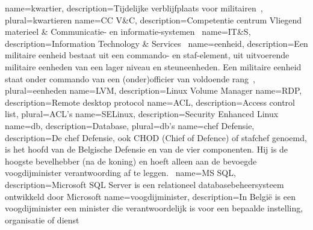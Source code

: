 \makeglossaries
{}
{
    name=kwartier,
    description={Tijdelijke verblijfplaats voor militairen~\autocite{Wikipedia2021}},
    plural=kwartieren
}
{
    name={CC V\&C},
    description={Competentie centrum Vliegend materieel \& Communicatie- en informatie-systemen~\autocite{Defensie2022a}}
}
{
    name=IT\&S,
    description={Information Technology \& Services~\autocite{Defensie2022a}}
}
{
    name=eenheid,
    description={Een militaire eenheid bestaat uit een commando- en staf-element, uit uitvoerende militaire eenheden van een lager niveau en steuneenheden. Een militaire eenheid staat onder commando van een (onder)officier van voldoende rang~\autocite{Wikipedia2021a}},
    plural=eenheden
}
{
    name=LVM,
    description={Linux Volume Manager}
}
{
    name=RDP,
    description={Remote desktop protocol}
}
{
    name=ACL,
    description={Access control list},
    plural={ACL's}
}
{
    name=SELinux,
    description={Security Enhanced Linux}
}
{
    name=db,
    description={Database},
    plural=db's
}
{
    name=chef Defensie,
    description={De chef Defensie, ook CHOD (Chief of Defence) of stafchef genoemd, is het hoofd van de Belgische Defensie en van de vier componenten. Hij is de hoogste bevelhebber (na de koning) en hoeft alleen aan de bevoegde \gls{voogdijminister} verantwoording af te leggen.~\autocite{Wikipedia2021b}}
}
{
    name={MS SQL},
    description={Microsoft SQL Server is een relationeel databasebeheersysteem ontwikkeld door Microsoft}
}
{
    name={voogdijminister},
    description={In België is een voogdijminister een minister die verantwoordelijk is voor een bepaalde instelling, organisatie of dienst}
}